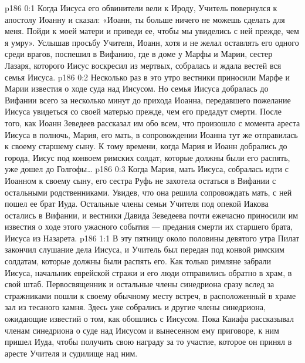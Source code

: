 \author{Комиссия срединников}
\vs p186 0:1 Когда Иисуса его обвинители вели к Ироду, Учитель повернулся к апостолу Иоанну и сказал: «Иоанн, ты больше ничего не можешь сделать для меня. Пойди к моей матери и приведи ее, чтобы мы увиделись с ней прежде, чем я умру». Услышав просьбу Учителя, Иоанн, хотя и не желал оставлять его одного среди врагов, поспешил в Вифанию, где в доме у Марфы и Марии, сестер Лазаря, которого Иисус воскресил из мертвых, собралась и ждала вестей вся семья Иисуса.
\vs p186 0:2 Несколько раз в это утро вестники приносили Марфе и Марии известия о ходе суда над Иисусом. Но семья Иисуса добралась до Вифании всего за несколько минут до прихода Иоанна, передавшего пожелание Иисуса увидеться со своей матерью прежде, чем его предадут смерти. После того, как Иоанн Зеведеев рассказал им обо всем, что произошло с момента ареста Иисуса в полночь, Мария, его мать, в сопровождении Иоанна тут же отправилась к своему старшему сыну. К тому времени, когда Мария и Иоанн добрались до города, Иисус под конвоем римских солдат, которые должны были его распять, уже дошел до Голгофы\ldots
\vs p186 0:3 Когда Мария, мать Иисуса, собралась идти с Иоанном к своему сыну, его сестра Руфь не захотела остаться в Вифании с остальными родственниками. Увидев, что она решила сопровождать мать, с ней пошел ее брат Иуда. Остальные члены семьи Учителя под опекой Иакова остались в Вифании, и вестники Давида Зеведеева почти ежечасно приносили им известия о ходе этого ужасного события --- предания смерти их старшего брата, Иисуса из Назарета.
\vs p186 1:1 В эту пятницу около половины девятого утра Пилат закончил слушание дела Иисуса, и Учитель был передан под конвой римским солдатам, которые должны были распять его. Как только римляне забрали Иисуса, начальник еврейской стражи и его люди отправились обратно в храм, в свой штаб. Первосвященник и остальные члены синедриона сразу вслед за стражниками пошли к своему обычному месту встреч, в расположенный в храме зал из тесаного камня. Здесь уже собрались и другие члены синедриона, ожидающие известий о том, как обошлись с Иисусом. Пока Каиафа рассказывал членам синедриона о суде над Иисусом и вынесенном ему приговоре, к ним пришел Иуда, чтобы получить свою награду за то участие, которое он принял в аресте Учителя и судилище над ним.
